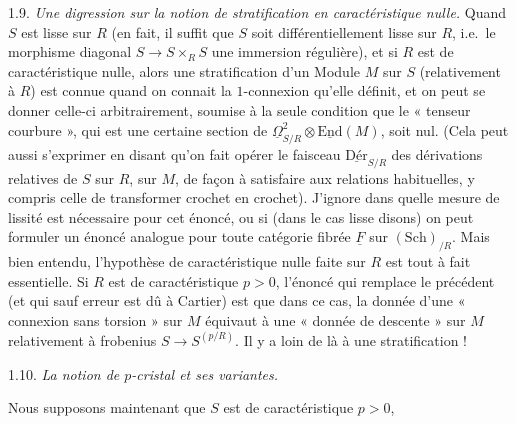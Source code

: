 \documentclass[11pt,a4paper]{article}
\begin{document}
1.9. \emph{Une digression sur la notion de stratification en caractéristique
nulle.} Quand $S$ est lisse sur $R$ (en fait, il suffit que $S$ soit
différentiellement lisse sur $R$, i.e.\ le morphisme diagonal
$S\to S\times_R S$ une immersion régulière), et si $R$ est de caractéristique
nulle, alors une stratification d'un Module $M$ sur $S$ (relativement à $R$)
est connue quand on connait la $1$-connexion qu'elle définit, et on peut se
donner celle-ci arbitrairement, soumise à la seule condition que le « tenseur
courbure », qui est une certaine section de
$\underline{\Omega}^2_{S/R}\otimes\underline{\mathrm{End}}(M)$, soit nul.
(Cela peut aussi s'exprimer en disant qu'on fait opérer le faisceau
$\underline{\mathrm{Dér}}_{S/R}$ des dérivations relatives de $S$ sur $R$, sur
$M$, de façon à satisfaire aux relations habituelles, y compris celle de
transformer crochet en crochet). J'ignore dans quelle mesure
 de lissité est nécessaire pour cet
énoncé, ou si (dans le cas lisse disons) on peut formuler
un énoncé analogue pour toute catégorie fibrée $\underline{F}$ sur
$(\mathrm{Sch})_{/R}$. Mais bien entendu, l'hypothèse de caractéristique nulle
faite sur $R$ est tout à fait essentielle. Si $R$ est de caractéristique $p>0$,
l'énoncé qui remplace le précédent (et qui sauf erreur est dû à Cartier) est
que dans ce cas, la donnée d'une « connexion sans torsion » sur $M$
 équivaut à une « donnée
de descente » sur $M$ relativement à frobenius $S\to S^{(p/R)}$. Il y a loin
de là à une  stratification !

1.10. \emph{La notion de $p$-cristal et ses variantes.}

Nous supposons maintenant que $S$ est de caractéristique $p>0$,
\struck{\ill{}}
\end{document}
